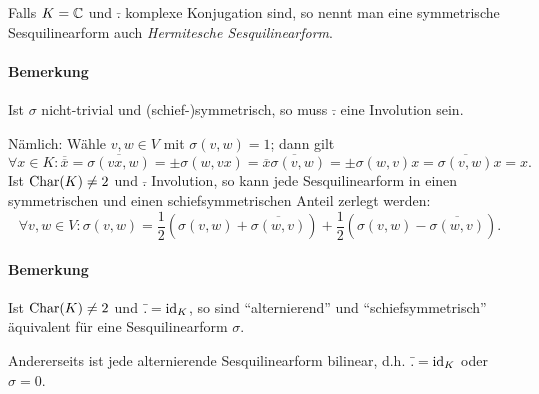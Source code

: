 \begin{Definition}
	Falls $ K =\mathbb{C} $ und $ \bar{.} $ komplexe Konjugation sind, so nennt man eine symmetrische Sesquilinearform auch \emph{Hermitesche Sesquilinearform}.
\end{Definition}

\paragraph{Bemerkung}
	Ist $ \sigma $ nicht-trivial und (schief-)symmetrisch, so muss $ \bar{.} $ eine Involution sein.
	
	Nämlich: Wähle $ v,w\in V $ mit $ \sigma(v,w) = 1$; dann gilt
		\[ \forall x\in K: \overline{\overline{x}} = \overline{\sigma(vx,w)} = \pm \sigma(w,vx) = \overline{\overline{x}\sigma(v,w)} = \pm \sigma(w,v)x = \overline{\sigma(v,w)}x = x. \]
	Ist $ \operatorname{Char}(K) \neq 2 $ und $ \bar{.}  $ Involution, so kann jede Sesquilinearform in einen symmetrischen und einen schiefsymmetrischen Anteil zerlegt werden:
		\[ \forall v,w\in V: \sigma(v,w) = \frac{1}{2}\left(\sigma(v,w)+\overline{\sigma(w,v)}\right) +\frac{1}{2}\left(\sigma(v,w)-\overline{\sigma(w,v)} \right).\]
\paragraph{Bemerkung}
	Ist $ \operatorname{Char}(K)\neq 2 $ und $ \bar{.} = \operatorname{id}_K $, so sind "`alternierend"' und "`schiefsymmetrisch"' äquivalent für eine Sesquilinearform $ \sigma $.
	
	Andererseits ist jede alternierende Sesquilinearform bilinear, d.h. $ \bar{.} = \operatorname{id}_K $ oder $ \sigma = 0 $.
	
